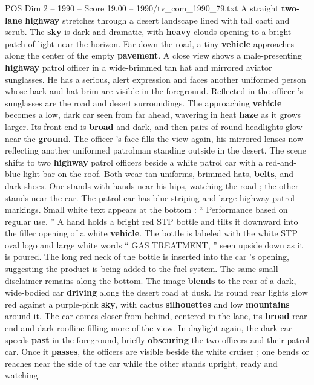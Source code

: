 \begin{textsample}{POS Dim 2 – 1990 – Score 19.00 – 1990/tv\_com\_1990\_79.txt}  \label{ex:f2_pos_036}
A straight \textbf{two-lane} \textbf{highway} stretches through a desert landscape lined with tall cacti and scrub.
The \textbf{sky} is dark and dramatic, with \textbf{heavy} clouds opening to a bright patch of light near the horizon.
Far down the road, a tiny \textbf{vehicle} approaches along the center of the empty \textbf{pavement}.
A close view shows a male-presenting \textbf{highway} patrol officer in a wide-brimmed tan hat and mirrored aviator sunglasses.
He has a serious, alert expression and faces another uniformed person whose back and hat brim are visible in the foreground.
Reflected in the officer ’s sunglasses are the road and desert surroundings.
The approaching \textbf{vehicle} becomes a low, dark car seen from far ahead, wavering in heat \textbf{haze} as it grows larger.
Its front end is \textbf{broad} and dark, and then pairs of round headlights glow near the \textbf{ground}.
The officer ’s face fills the view again, his mirrored lenses now reflecting another uniformed patrolman standing outside in the desert.
The scene shifts to two \textbf{highway} patrol officers beside a white patrol car with a red-and-blue light bar on the roof.
Both wear tan uniforms, brimmed hats, \textbf{belts}, and dark shoes.
One stands with hands near his hips, watching the road ; the other stands near the car.
The patrol car has blue striping and large highway-patrol markings.
Small white text appears at the bottom : “ Performance based on regular use. ” A hand holds a bright red STP bottle and tilts it downward into the filler opening of a white \textbf{vehicle}.
The bottle is labeled with the white STP oval logo and large white words “ GAS TREATMENT, ” seen upside down as it is poured.
The long red neck of the bottle is inserted into the car ’s opening, suggesting the product is being added to the fuel system.
The same small disclaimer remains along the bottom.
The image \textbf{blends} to the rear of a dark, wide-bodied car \textbf{driving} along the desert road at dusk.
Its round rear lights glow red against a purple-pink \textbf{sky}, with cactus \textbf{silhouettes} and low \textbf{mountains} around it.
The car comes closer from behind, centered in the lane, its \textbf{broad} rear end and dark roofline filling more of the view.
In daylight again, the dark car speeds \textbf{past} in the foreground, briefly \textbf{obscuring} the two officers and their patrol car.
Once it \textbf{passes}, the officers are visible beside the white cruiser ; one bends or reaches near the side of the car while the other stands upright, ready and watching.

\end{textsample}
